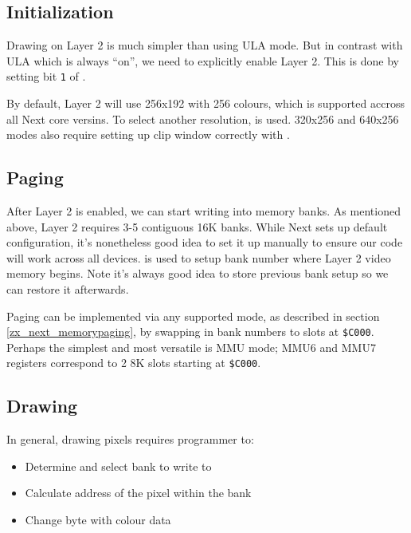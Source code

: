 \documentclass[12pt,twoside,openright,a4paper]{book}
\begin{document}
\subsection{Initialization}

Drawing on Layer 2 is much simpler than using ULA mode. But in contrast with ULA which is always ``on'', we need to explicitly enable Layer 2. This is done by setting bit {\tt 1} of .

By default, Layer 2 will use 256x192 with 256 colours, which is supported accross all Next core versins. To select another resolution,  is used. 320x256 and 640x256 modes also require setting up clip window correctly with .


\subsection{Paging}

After Layer 2 is enabled, we can start writing into memory banks. As mentioned above, Layer 2 requires 3-5 contiguous 16K banks. While Next sets up default configuration, it's nonetheless good idea to set it up manually to ensure our code will work across all devices.  is used to setup bank number where Layer 2 video memory begins. Note it's always good idea to store previous bank setup so we can restore it afterwards.

Paging can be implemented via any supported mode, as described in section \ref{zx_next_memorypaging}, by swapping in bank numbers to slots at {\tt \$C000}. Perhaps the simplest and most versatile is MMU mode; MMU6 and MMU7 registers correspond to 2 8K slots starting at {\tt \$C000}.

\subsection{Drawing}

In general, drawing pixels requires programmer to:

\begin{itemize}[topsep=1pt,itemsep=1pt]
	\item Determine and select bank to write to
	\item Calculate address of the pixel within the bank
	\item Change byte with colour data
\end{itemize}
\end{document}
